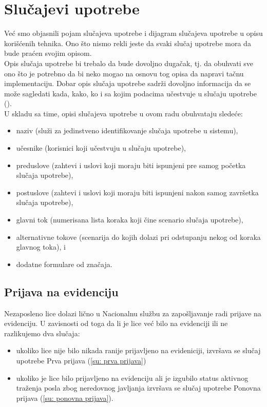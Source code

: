 \section{Slu\v cajevi upotrebe}

Ve\' c smo objasnili pojam slu\v cajeva upotrebe i dijagram slu\v cajeva upotrebe u opisu kori\v s\' cenih tehnika. Ono \v sto nismo rekli jeste da svaki slu\v caj upotrebe mora da bude pra\' cen svojim opisom.\\

Opis slu\v caja upotrebe bi trebalo da bude dovoljno duga\v cak, tj. da obuhvati sve ono \v sto je potrebno da bi neko mogao na osnovu tog opisa da napravi ta\v cnu implementaciju. Dobar opis slu\v caja upotrebe sadr\v zi dovoljno informacija da se mo\v ze sagledati kada, kako, ko i sa kojim podacima u\v cestvuje u slu\v caju upotrebe (\cite{smalkov-slajdovi}).\\

U skladu sa time, opisi slu\v cajeva upotrebe u ovom radu obuhvataju slede\'ce:
\begin{itemize}
	\item naziv (slu\v zi za jedinstveno identifikovanje slu\v caja upotrebe u sistemu), 
	\item u\v cesnike (korisnici koji u\v cestvuju u slu\v caju upotrebe),
	\item preduslove (zahtevi i uslovi koji moraju biti ispunjeni pre samog po\v cetka slu\v caja upotrebe), 
	\item postuslove (zahtevi i uslovi koji moraju biti ispunjeni nakon samog zavr\v setka slu\v caja upotrebe), 
	\item glavni tok (numerisana lista koraka koji \v cine scenario slu\v caja upotrebe), 
	\item alternativne tokove (scenarija do kojih dolazi pri odstupanju nekog od koraka glavnog toka), i 
	\item dodatne formulare od zna\v caja.
\end{itemize}

\subsection{Prijava na evidenciju}

Nezaposleno lice dolazi li\v cno u Nacionalnu slu\v zbu za zapo\v sljavanje radi prijave na evidenciju. U zavisnosti od toga da li je lice ve\' c bilo na evidenciji ili ne razlikujemo dva slu\v caja:

\begin{itemize}
	\item ukoliko lice nije bilo nikada ranije prijavljeno na evideniciji, izvr\v sava se slu\v caj upotrebe Prva prijava (\ref{su: prva prijava})
	\item ukoliko je lice bilo prijavljeno na evidenciju ali je izgubilo status aktivnog tra\v zenja posla zbog neredovnog javljanja izvr\v sava se slu\v caj upotrebe Ponovna prijava (\ref{su: ponovna prijava}).
\end{itemize}

